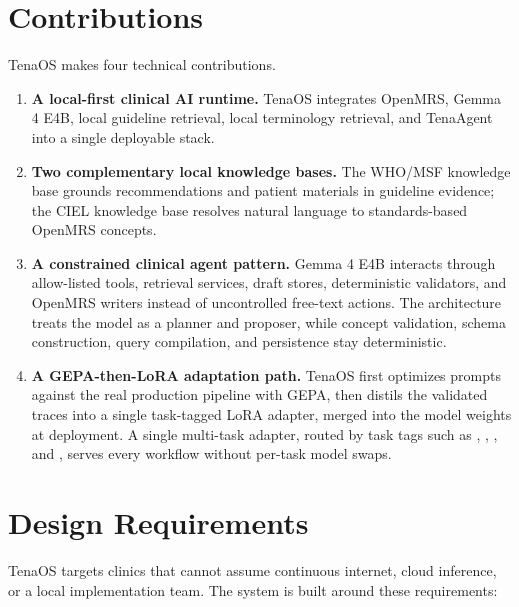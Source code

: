 \documentclass[11pt]{article}
\newcommand{\Product}{TenaOS}
\newcommand{\Gemma}{Gemma 4 E4B}
\newcommand{\OpenMRS}{OpenMRS}
\newcommand{\CIEL}{CIEL}
\newcommand{\WHO}{WHO/MSF}
\newcommand{\code}[1]{{\setlength{\fboxsep}{1.7pt}\colorbox{codebg}{\textcolor{codeink}{\small\ttfamily #1}}}}
\begin{document}
\section{Contributions}

\Product{} makes four technical contributions.

\begin{enumerate}
  \item \textbf{A local-first clinical AI runtime.} \Product{} integrates \OpenMRS{}, \Gemma{}, local guideline retrieval, local terminology retrieval, and TenaAgent into a single deployable stack.
  \item \textbf{Two complementary local knowledge bases.} The \WHO{} knowledge base grounds recommendations and patient materials in guideline evidence; the \CIEL{} knowledge base resolves natural language to standards-based \OpenMRS{} concepts.
  \item \textbf{A constrained clinical agent pattern.} \Gemma{} interacts through allow-listed tools, retrieval services, draft stores, deterministic validators, and \OpenMRS{} writers instead of uncontrolled free-text actions. The architecture treats the model as a planner and proposer, while concept validation, schema construction, query compilation, and persistence stay deterministic.
  \item \textbf{A GEPA-then-LoRA adaptation path.} \Product{} first optimizes prompts against the real production pipeline with GEPA, then distils the validated traces into a single task-tagged LoRA adapter, merged into the model weights at deployment. A single multi-task adapter, routed by task tags such as \code{[form]}, \code{[report]}, \code{[scribe]}, and \code{[cds]}, serves every workflow without per-task model swaps.
\end{enumerate}

\section{Design Requirements}

\Product{} targets clinics that cannot assume continuous internet, cloud inference, or a local implementation team. The system is built around these requirements:
\end{document}
